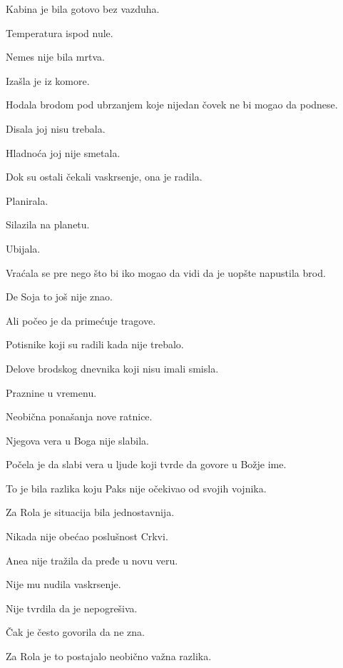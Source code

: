 Kabina je bila gotovo bez vazduha.

Temperatura ispod nule.

\bigskip

Nemes nije bila mrtva.

\bigskip

Izašla je iz komore.

Hodala brodom pod ubrzanjem koje nijedan čovek ne bi mogao da podnese.

Disala joj nisu trebala.

Hladnoća joj nije smetala.

\bigskip

Dok su ostali čekali vaskrsenje, ona je radila.

Planirala.

Silazila na planetu.

Ubijala.

Vraćala se pre nego što bi iko mogao da vidi da je uopšte napustila brod.

\bigskip

De Soja to još nije znao.

Ali počeo je da primećuje tragove.

Potisnike koji su radili kada nije trebalo.

Delove brodskog dnevnika koji nisu imali smisla.

Praznine u vremenu.

Neobična ponašanja nove ratnice.

\bigskip

Njegova vera u Boga nije slabila.

Počela je da slabi vera u ljude koji tvrde da govore u Božje ime.

\bigskip

To je bila razlika koju Paks nije očekivao od svojih vojnika.

\bigskip

Za Rola je situacija bila jednostavnija.

Nikada nije obećao poslušnost Crkvi.

Anea nije tražila da pređe u novu veru.

Nije mu nudila vaskrsenje.

Nije tvrdila da je nepogrešiva.

\bigskip

Čak je često govorila da ne zna.

\bigskip

Za Rola je to postajalo neobično važna razlika.

